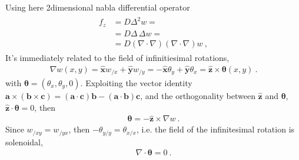 \documentclass[letterpaper,10pt,english]{jupyterBook}
\begin{document}
\sphinxAtStartPar
Using here 2\sphinxhyphen{}dimensional nabla differential operator
\begin{equation*}
\begin{split}\begin{aligned}
  f_z 
  & = D \Delta^2 w = \\
  & = D \Delta \, \Delta w = \\
  & = D ( \nabla \cdot \nabla ) ( \nabla \cdot \nabla ) w \ ,
\end{aligned}\end{split}
\end{equation*}
\sphinxAtStartPar
{} It’s immediately related to the field of infinitiesimal rotations,
\begin{equation*}
\begin{split}\nabla w(x,y) = \hat{\mathbf{x}} w_{/x} + \hat{\mathbf{y}} w_{/y} = - \hat{\mathbf{x}} \theta_{y} + \hat{\mathbf{y}} \theta_{x} = \hat{\mathbf{z}} \times \boldsymbol\theta(x,y) \ .\end{split}
\end{equation*}
\sphinxAtStartPar
with \(\boldsymbol\theta = ( \theta_x, \theta_y, 0)\). Exploiting the vector identity \(\mathbf{a} \times ( \mathbf{b} \times \mathbf{c} ) = ( \mathbf{a} \cdot \mathbf{c} ) \mathbf{b} - ( \mathbf{a} \cdot \mathbf{b}) \mathbf{c}\), and the orthogonality between \(\hat{\mathbf{z}}\) and \(\boldsymbol\theta\), \(\hat{\mathbf{z}} \cdot \boldsymbol\theta = 0\), then
\begin{equation*}
\begin{split}\boldsymbol\theta = - \hat{\mathbf{z}} \times \nabla w \ .\end{split}
\end{equation*}
\sphinxAtStartPar
Since \(w_{/xy} = w_{/yx}\), then \(-\theta_{y/y} = \theta_{x/x}\), i.e. the field of the infinitesimal rotation is solenoidal,
\begin{equation*}
\begin{split}\nabla \cdot \boldsymbol\theta = 0 \ .\end{split}
\end{equation*}
\end{document}
